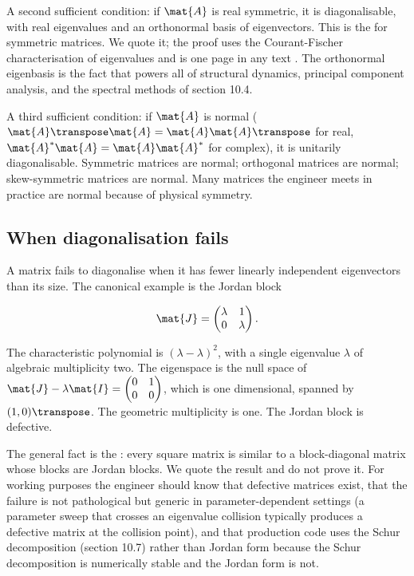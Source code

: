 A second sufficient condition: if $\mat{A}$ is real symmetric, it is
diagonalisable, with real eigenvalues and an orthonormal basis of
eigenvectors. This is the  for symmetric
matrices. We quote it; the proof uses the Courant-Fischer
characterisation of eigenvalues and is one page in any text
\cite[ch.~6]{text:strang2016}. The orthonormal eigenbasis is the
fact that powers all of structural dynamics, principal component
analysis, and the spectral methods of section 10.4.

A third sufficient condition: if $\mat{A}$ is normal ($\mat{A}\transpose
\mat{A} = \mat{A}\mat{A}\transpose$ for real, $\mat{A}^{*}\mat{A} =
\mat{A}\mat{A}^{*}$ for complex), it is unitarily diagonalisable.
Symmetric matrices are normal; orthogonal matrices are normal;
skew-symmetric matrices are normal. Many matrices the engineer meets
in practice are normal because of physical symmetry.

\subsection{When diagonalisation fails}

A matrix fails to diagonalise when it has fewer linearly independent
eigenvectors than its size. The canonical example is the Jordan
block

\[
\mat{J} = \begin{pmatrix} \lambda & 1 \\ 0 & \lambda \end{pmatrix}.
\]

The characteristic polynomial is $(\lambda - \lambda)^{2}$, with a
single eigenvalue $\lambda$ of algebraic multiplicity two. The
eigenspace is the null space of $\mat{J} - \lambda \mat{I} =
\begin{pmatrix} 0 & 1 \\ 0 & 0 \end{pmatrix}$, which is one
dimensional, spanned by $(1, 0)\transpose$. The geometric multiplicity
is one. The Jordan block is defective.

The general fact is the : every
square matrix is similar to a block-diagonal matrix whose blocks
are Jordan blocks. We quote the result and do not prove it. For
working purposes the engineer should know that defective matrices
exist, that the failure is not pathological but generic in
parameter-dependent settings (a parameter sweep that crosses an
eigenvalue collision typically produces a defective matrix at the
collision point), and that production code uses the Schur
decomposition (section 10.7) rather than Jordan form because the
Schur decomposition is numerically stable and the Jordan form is
not.

